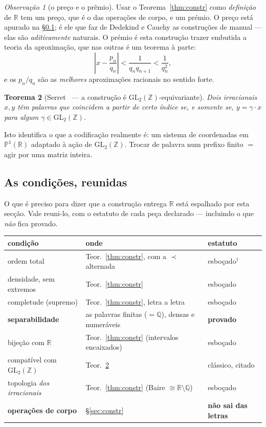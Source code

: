 \documentclass[11pt,a4paper]{article}
\theoremstyle{plain}
\newtheorem{teorema}{Teorema}[section]
\theoremstyle{definition}
\theoremstyle{remark}
\newtheorem{obs}[teorema]{Observação}
\newcommand{\R}{\mathbb{R}}
\newcommand{\Q}{\mathbb{Q}}
\newcommand{\Z}{\mathbb{Z}}
\newcommand{\Pj}{\mathbb{P}^1}
\newcommand{\GL}{\mathrm{GL}}
\begin{document}
\begin{obs}[o preço e o prêmio]
Usar o Teorema~\ref{thm:constr} como \emph{definição} de $\R$ tem um preço, que é o das operações
de corpo, e um prémio. O preço está apurado na \S\ref{sec:condicoes}; é ele que faz de Dedekind e
Cauchy as construções de manual --- elas são \emph{aditivamente} naturais. O prémio é esta
construção trazer embutida a teoria da aproximação, que nas outras é um teorema à parte:
\[
  \left| x - \frac{p_n}{q_n}\right| < \frac{1}{q_nq_{n+1}} < \frac{1}{q_n^2},
\]
e os $p_n/q_n$ são as \emph{melhores} aproximações racionais no sentido forte.
\end{obs}

\begin{teorema}[Serret~\cite{serret} --- a construção é $\GL_2(\Z)$-equivariante]\label{thm:serret}
Dois irracionais $x,y$ têm palavras que coincidem a partir de certo índice se, e somente se,
$y = \gamma\cdot x$ para algum $\gamma\in\GL_2(\Z)$.
\end{teorema}

\noindent
Isto identifica o que a codificação realmente é: um sistema de coordenadas em $\Pj(\R)$ adaptado
à ação de $\GL_2(\Z)$. Trocar de palavra num prefixo finito $=$ agir por uma matriz inteira.

\subsection{As condições, reunidas}\label{sec:condicoes}

O que é preciso para dizer que a construção entrega $\R$ está espalhado por esta secção. Vale reuni-lo,
com o estatuto de cada peça declarado --- incluindo o que \emph{não} fica provado.

\begin{center}\small
\begin{tabular}{lll}
\hline
condição & onde & estatuto \\ \hline
ordem total & Teor.~\ref{thm:constr}, com a $\prec$ alternada & esboçado$^\dagger$ \\
densidade, sem extremos & Teor.~\ref{thm:constr} & esboçado \\
completude (supremo) & Teor.~\ref{thm:constr}, letra a letra & esboçado \\
\textbf{separabilidade} & as palavras finitas ($=\Q$), densas e numeráveis & \textbf{provado} \\
bijeção com $\R$ & Teor.~\ref{thm:constr} (intervalos encaixados) & esboçado \\
compatível com $\GL_2(\Z)$ & Teor.~\ref{thm:serret} & clássico, citado \\
topologia \emph{dos irracionais} & Teor.~\ref{thm:constr} (Baire $\cong\R\setminus\Q$) & esboçado \\[2pt]
\textbf{operações de corpo} & \S\ref{sec:constr} & \textbf{não sai das letras} \\
\hline
\end{tabular}
\end{center}
\end{document}
